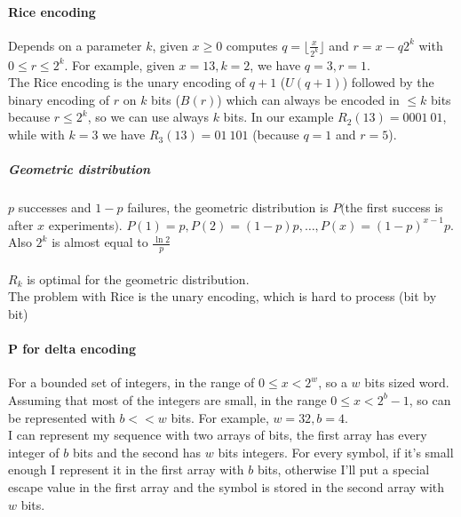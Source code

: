 \documentclass[10pt]{report}
\begin{document}
\paragraph{Rice encoding} Depends on a parameter $k$, given $x \geq 0$ computes $q = \lfloor\frac{x}{2^k}\rfloor$ and $r = x - q2^k$ with $0\leq r \leq 2^k$. For example, given $x=13, k=2$, we have $q = 3, r = 1$.\\
The Rice encoding is the unary encoding of $q+1$ ($U(q+1)$) followed by the binary encoding of $r$ on $k$ bits ($B(r)$) which can always be encoded in $\leq k$ bits because $r \leq 2^k$, so we can use always $k$ bits. In our example $R_2(13) = 0001\:01$, while with $k=3$ we have $R_3(13) = 01\:101$ (because $q=1$ and $r=5$).
\subparagraph{Geometric distribution} $p$ successes and $1-p$ failures, the geometric distribution is $P($the first success is after $x$ experiments$)$. $P(1) = p, P(2) = (1-p)p,\ldots,P(x) = (1-p)^{x-1}p$.\\
Also $2^k$ is almost equal to $\frac{\ln 2}{p}$\\\\
$R_k$ is optimal for the geometric distribution.\\
The problem with Rice is the unary encoding, which is hard to process (bit by bit)

\paragraph{P for delta encoding} For a bounded set of integers, in the range of $0\leq x < 2^w$, so a $w$ bits sized word. Assuming that most of the integers are small, in the range $0\leq x < 2^b - 1$, so can be represented with $b << w$ bits. For example, $w = 32, b = 4$.\\
I can represent my sequence with two arrays of bits, the first array has every integer of $b$ bits and the second has $w$ bits integers. For every symbol, if it's small enough I represent it in the first array with $b$ bits, otherwise I'll put a special escape value in the first array and the symbol is stored in the second array with $w$ bits.
\end{document}
